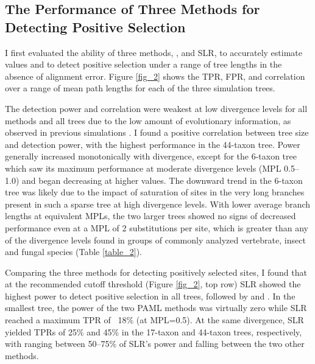 \subsection{The Performance of Three Methods for Detecting \Sw Positive Selection}
I first evaluated the ability of three \sw methods, \mtwo, \meight
and SLR, to accurately estimate \sw \omg values and to detect
positive selection under a range of tree lengths in the absence of
alignment error. Figure \ref{fig_2} shows the TPR, FPR, \tpr{} and \sw
\omg correlation over a range of mean path lengths
 for each of the three simulation trees.

The detection power and \omg correlation were weakest at low
divergence levels for all methods and all trees due to the low amount
of evolutionary information, as observed in previous simulations
\citep{Anisimova2002Accuracy}. I found a positive correlation between
tree size and detection power, with the highest performance in the
44-taxon tree. Power generally increased monotonically with
divergence, except for the 6-taxon tree which saw its maximum
performance at moderate divergence levels (MPL 0.5--1.0) and began
decreasing at higher values. The downward trend in the 6-taxon tree
was likely due to the impact of saturation of \syn sites in the
very long branches present in such a sparse tree at high divergence
levels. With lower average branch lengths at equivalent MPLs, the two
larger trees showed no signs of decreased performance even at a MPL of
2 substitutions per site, which is greater than any of the divergence
levels found in groups of commonly analyzed vertebrate, insect and
fungal species (Table \ref{table_2}).

Comparing the three methods for detecting positively selected sites, I found that at the
recommended cutoff threshold (Figure \ref{fig_2}, top row) SLR showed
the highest power to detect positive selection in all trees, followed
by \meight and \mtwo. In the smallest tree, the power of the two
PAML methods was virtually zero while SLR reached a maximum TPR of ~18\%
(at MPL=0.5). At the same divergence, SLR yielded TPRs of 25\% and 45\%
in the 17-taxon and 44-taxon trees, respectively, with \mtwo ranging
between 50--75\% of SLR's power and \meight falling between the two
other methods.

